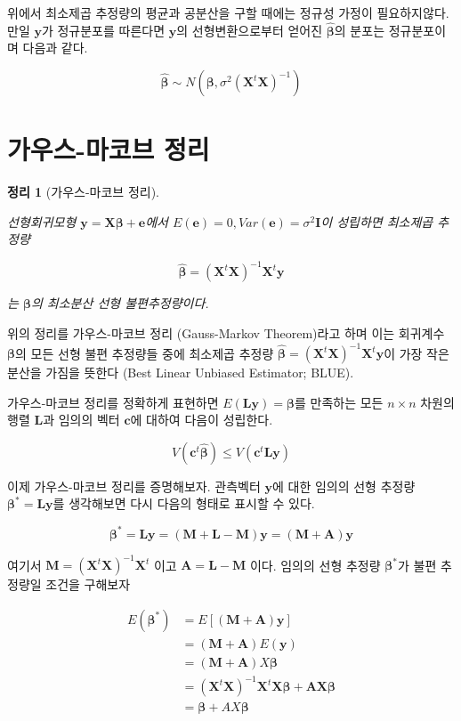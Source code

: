\documentclass[
  11pt,
  a4paper,
  oneside]{scrbook}
\theoremstyle{definition}
\theoremstyle{plain}
\newtheorem{theorem}{정리}[chapter]
\theoremstyle{definition}
\theoremstyle{definition}
\theoremstyle{remark}
\begin{document}
위에서 최소제곱 추정량의 평균과 공분산을 구할 때에는 정규성 가정이
필요하지않다. 만일 \(\pmb y\)가 정규분포를 따른다면 \(\pmb y\)의
선형변환으로부터 얻어진 \(\hat {\pmb \beta}\)의 분포는 정규분포이며
다음과 같다.

\[  \hat {\pmb \beta}  \sim N \left (\pmb \beta, \sigma^2( \pmb X^t \pmb X)^{-1} \right ) \]

\section{가우스-마코브
정리}\label{uxac00uxc6b0uxc2a4-uxb9c8uxcf54uxbe0c-uxc815uxb9ac}

\begin{theorem}[가우스-마코브
정리]\protect\hypertarget{thm-line}{}\label{thm-line}

선형회귀모형 \(\pmb y =  \pmb X  \pmb \beta +  \pmb e\)에서
\(E( \pmb e)=0, Var( \pmb e)=\sigma^2 \pmb I\)이 성립하면 최소제곱
추정량

\[ \hat{\pmb \beta}=(\pmb X^t \pmb X)^{-1} \pmb X^t \pmb y\]

는 \(\pmb \beta\)의 최소분산 선형 불편추정량이다.

\end{theorem}

위의 정리를 가우스-마코브 정리 (Gauss-Markov Theorem)라고 하며 이는
회귀계수 \(\pmb \beta\)의 모든 선형 불편 추정량들 중에 최소제곱 추정량
\(\hat {\pmb \beta}=(\pmb X^t \pmb X)^{-1} \pmb X^t \pmb y\)이 가장 작은
분산을 가짐을 뜻한다 (Best Linear Unbiased Estimator; BLUE).

가우스-마코브 정리를 정확하게 표현하면
\(E(\pmb L \pmb y) = \pmb \beta\)를 만족하는 모든 \(n \times n\) 차원의
행렬 \(\pmb L\)과 임의의 벡터 \(\pmb c\)에 대하여 다음이 성립한다.

\[ V(\pmb c^t \hat {\pmb \beta}) \le V(\pmb c^t \pmb L \pmb y)  \]

이제 가우스-마코브 정리를 증명해보자. 관측벡터 \(\pmb y\)에 대한 임의의
선형 추정량 \(\pmb \beta^* = \pmb L \pmb y\)를 생각해보면 다시 다음의
형태로 표시할 수 있다.

\[  
\pmb \beta^* =  \pmb L  \pmb y = (\pmb M + \pmb L -\pmb M ) \pmb y = ( \pmb M +  \pmb A)  \pmb y 
\]

여기서 \(\pmb M = ( \pmb X^t \pmb X)^{-1} \pmb X^t\) 이고
\(\pmb A= \pmb L- \pmb M\) 이다. 임의의 선형 추정량 \(\pmb \beta^*\)가
불편 추정량일 조건을 구해보자

\[
\begin{align}
 E( \pmb \beta^*) & = E[( \pmb M+ \pmb A) \pmb y] \\
            & = ( \pmb M+ \pmb A)E( \pmb y) \\
            & = ( \pmb M+ \pmb A)X \pmb \beta \\
            & = ( \pmb X^t  \pmb X)^{-1} \pmb X^t  \pmb X  \pmb \beta +  \pmb A  \pmb X  \pmb \beta \\
            & =  \pmb \beta+AX \pmb \beta\\
\end{align}
\]
\end{document}
